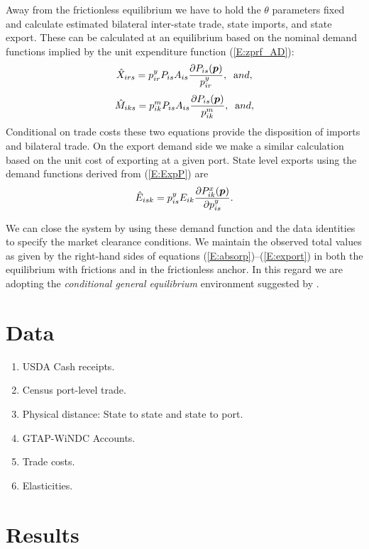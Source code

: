 \documentclass{ejb}
\newcommand{\pv}{\mbox{\boldmath$p$}}
\begin{document}
Away from the frictionless equilibrium we have to hold the $\theta$
parameters fixed and calculate estimated 
bilateral inter-state trade, state imports, and state export.  These
can be calculated at an equilibrium based on the nominal demand
functions implied by the unit expenditure function (\ref{E:zprf_AD}):
\begin{equation}
\hat{X}_{irs} = p^y_{ir} P_{is} A_{is} \frac{\partial P_{is}(\pv)}{p^y_{ir}},
\;\; {\mbox and,}
\label{E:xhat}
\end{equation}
\begin{equation}
\hat{M}_{iks} = p^m_{ik} P_{is} A_{is} \frac{\partial
P_{is}(\pv)}{p^m_{ik}},
\;\; {\mbox and,}
\label{E:mhat}
\end{equation}
Conditional on trade costs these two equations provide the disposition
of imports and bilateral trade.  On the export demand side we make a
similar calculation based on the unit cost of exporting at a given
port.  State level exports using the demand functions derived from
(\ref{E:ExpP}) are
\begin{equation}
\label{E:ExpbySt}
\hat{E}_{isk} = p^y_{is} E_{ik} \frac{\partial P^x_{ik}(\pv)}{\partial p^y_{is}}.
\end{equation} 

We can close the system by using these demand function and the data
identities to specify the market clearance conditions.  We maintain
the observed total values as given by the right-hand sides of
equations (\ref{E:absorp})--(\ref{E:export}) in both the equilibrium
with frictions and in the frictionless anchor. In this regard we are
adopting the \emph{conditional general equilibrium} environment
suggested by \citet[p75]{Yotov_etal}.    

\section{Data}
\label{data}
\begin{enumerate}
	\item USDA Cash receipts.
	\item Census port-level trade.
	\item Physical distance: State to state and state to port.
	\item GTAP-WiNDC Accounts.
	\item Trade costs.
	\item Elasticities.
\end{enumerate}

\section{Results}
\label{results}
\end{document}
